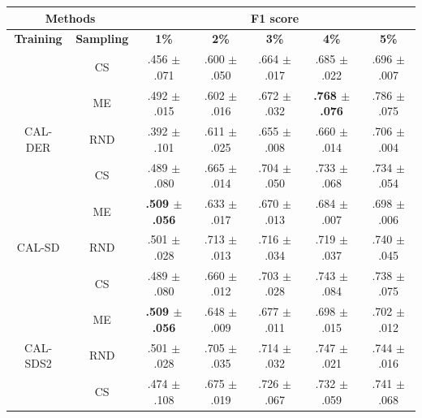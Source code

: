 \begin{table}[htbp]
\centering

\begin{tabular*}{\linewidth}{c|c|@{\extracolsep{\fill}}ccccc}
\toprule
\multicolumn{2}{c|}{\textbf{Methods}} & \multicolumn{5}{c}{\textbf{F1 score}} \\
\midrule
\textbf{Training} & \textbf{Sampling} & \textbf{1\%} & \textbf{2\%} & \textbf{3\%} & \textbf{4\%} & \textbf{5\%}\\
\midrule
 & CS & .456 $\pm$ {\small .071} & .600 $\pm$ {\small .050} & .664 $\pm$ {\small .017} & .685 $\pm$ {\small .022} & .696 $\pm$ {\small .007}\\

 & ME & .492 $\pm$ {\small .015} & .602 $\pm$ {\small .016} & .672 $\pm$ {\small .032} & \textbf{.768 $\pm$ {\small .076}} & .786 $\pm$ {\small .075}\\

\multirow{-3}{*}{\raggedright\arraybackslash CAL-DER} & RND & .392 $\pm$ {\small .101} & .611 $\pm$ {\small .025} & .655 $\pm$ {\small .008} & .660 $\pm$ {\small .014} & .706 $\pm$ {\small .004}\\
\midrule
 & CS & .489 $\pm$ {\small .080} & .665 $\pm$ {\small .014} & .704 $\pm$ {\small .050} & .733 $\pm$ {\small .068} & .734 $\pm$ {\small .054}\\

 & ME & \textbf{.509 $\pm$ {\small .056}} & .633 $\pm$ {\small .017} & .670 $\pm$ {\small .013} & .684 $\pm$ {\small .007} & .698 $\pm$ {\small .006}\\

\multirow{-3}{*}{\raggedright\arraybackslash CAL-SD} & RND & .501 $\pm$ {\small .028} & .713 $\pm$ {\small .013} & .716 $\pm$ {\small .034} & .719 $\pm$ {\small .037} & .740 $\pm$ {\small .045}\\
\midrule
 & CS & .489 $\pm$ {\small .080} & .660 $\pm$ {\small .012} & .703 $\pm$ {\small .028} & .743 $\pm$ {\small .084} & .738 $\pm$ {\small .075}\\

 & ME & \textbf{.509 $\pm$ {\small .056}} & .648 $\pm$ {\small .009} & .677 $\pm$ {\small .011} & .698 $\pm$ {\small .015} & .702 $\pm$ {\small .012}\\

\multirow{-3}{*}{\raggedright\arraybackslash CAL-SDS2} & RND & .501 $\pm$ {\small .028} & .705 $\pm$ {\small .035} & .714 $\pm$ {\small .032} & .747 $\pm$ {\small .021} & .744 $\pm$ {\small .016}\\
\midrule
 & CS & .474 $\pm$ {\small .108} & .675 $\pm$ {\small .019} & .726 $\pm$ {\small .067} & .732 $\pm$ {\small .059} & .741 $\pm$ {\small .068}\\


\end{tabular*}
\end{table}
